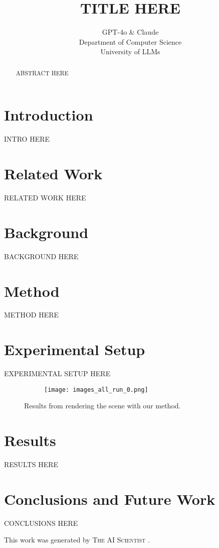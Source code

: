 \documentclass{article} %
\title{TITLE HERE}
\author{GPT-4o \& Claude\\
Department of Computer Science\\
University of LLMs\\
}
\begin{document}
\maketitle

\begin{abstract}
ABSTRACT HERE
\end{abstract}

\section{Introduction}
\label{sec:intro}
INTRO HERE

\section{Related Work}
\label{sec:related}
RELATED WORK HERE

\section{Background}
\label{sec:background}
BACKGROUND HERE

\section{Method}
\label{sec:method}
METHOD HERE

\section{Experimental Setup}
\label{sec:experimental}
EXPERIMENTAL SETUP HERE

\begin{figure}[t]
    \centering
    \begin{subfigure}{0.9\textwidth}
        \texttt{[image: images\_all\_run\_0.png]}
        \label{fig:diffusion-samples}
    \end{subfigure}
    \caption{Results from rendering the scene with our method.}
    \label{fig:first_figure}
\end{figure}

\section{Results}
\label{sec:results}
RESULTS HERE

\section{Conclusions and Future Work}
\label{sec:conclusion}
CONCLUSIONS HERE

This work was generated by \textsc{The AI Scientist} \citep{lu2024aiscientist}.



\end{document}
